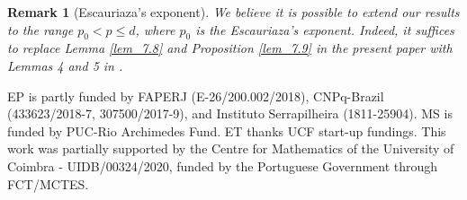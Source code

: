 \documentclass[10pt]{article} %
\newtheorem{Remark}{Remark}
\begin{document}
\begin{Remark}[Escauriaza's exponent] 
We believe it is possible to extend our results to the range $p_0< p\leq d$, where $p_0$ is the Escauriaza's exponent. Indeed, it suffices to replace Lemma \ref{lem_7.8}  and Proposition \ref{lem_7.9} in the present paper with Lemmas 4 and 5 in \cite{escauriaza}. 
\end{Remark}

\bigskip

 EP is partly funded by FAPERJ (E-26/200.002/2018), CNPq-Brazil (433623/2018-7, 307500/2017-9), and Instituto Serrapilheira (1811-25904).
MS is funded by PUC-Rio Archimedes Fund. ET thanks UCF start-up fundings. This work was partially supported by the Centre for Mathematics of the University of Coimbra - UIDB/00324/2020, funded by the Portuguese Government through FCT/MCTES.
\end{document}
